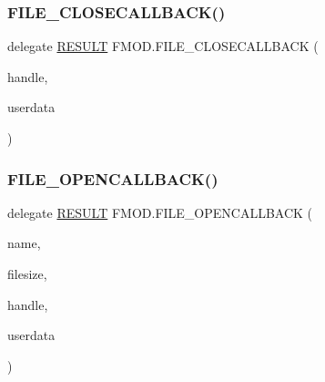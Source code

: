 \subsubsection{\texorpdfstring{F\+I\+L\+E\+\_\+\+C\+L\+O\+S\+E\+C\+A\+L\+L\+B\+A\+C\+K()}{FILE\_CLOSECALLBACK()}}
{\footnotesize\ttfamily delegate \hyperlink{namespace_f_m_o_d_a305d1176ef3f8c8815861a60407ac33d}{R\+E\+S\+U\+LT} F\+M\+O\+D.\+F\+I\+L\+E\+\_\+\+C\+L\+O\+S\+E\+C\+A\+L\+L\+B\+A\+CK (\begin{DoxyParamCaption}\item[{Int\+Ptr}]{handle,  }\item[{Int\+Ptr}]{userdata }\end{DoxyParamCaption})}

\mbox{\label{namespace_f_m_o_d_a6aacb40c0bfa3448934de11beb9ed447}} 
\subsubsection{\texorpdfstring{F\+I\+L\+E\+\_\+\+O\+P\+E\+N\+C\+A\+L\+L\+B\+A\+C\+K()}{FILE\_OPENCALLBACK()}}
{\footnotesize\ttfamily delegate \hyperlink{namespace_f_m_o_d_a305d1176ef3f8c8815861a60407ac33d}{R\+E\+S\+U\+LT} F\+M\+O\+D.\+F\+I\+L\+E\+\_\+\+O\+P\+E\+N\+C\+A\+L\+L\+B\+A\+CK (\begin{DoxyParamCaption}\item[{\hyperlink{struct_f_m_o_d_1_1_string_wrapper}{String\+Wrapper}}]{name,  }\item[{ref uint}]{filesize,  }\item[{ref Int\+Ptr}]{handle,  }\item[{Int\+Ptr}]{userdata }\end{DoxyParamCaption})}

\mbox{\label{namespace_f_m_o_d_a074a94c39aa2d2569a57ed255f6c9011}} 
